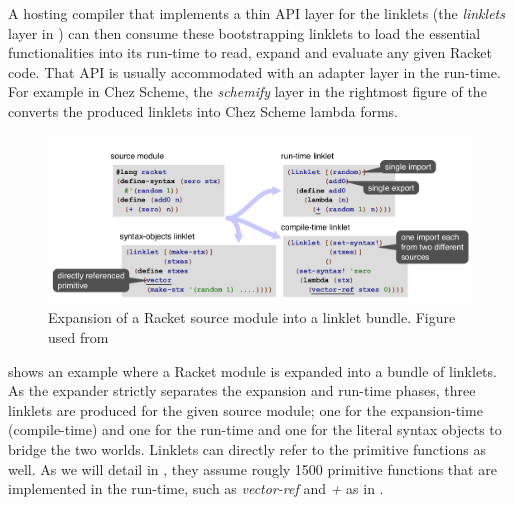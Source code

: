 A hosting compiler that implements a thin API layer for the linklets
(the \emph{linklets} layer in ) can then
consume these bootstrapping linklets to load the essential
functionalities into its run-time to read, expand and evaluate any
given Racket code. That API is usually accommodated with an adapter
layer in the run-time. For example in Chez Scheme, the \emph{schemify}
layer in the rightmost figure of the 
converts the produced linklets into Chez Scheme lambda forms.

\begin{figure}[h]
  \centering
  \includegraphics[scale=0.3]{img/racket-expand-example}
  \caption{Expansion of a Racket source module into a linklet
    bundle. Figure used from \cite{racket-on-chez-19}}
  \label{fig:racket-expand-example}
\end{figure}

 shows an example where a Racket
module is expanded into a bundle of linklets. As the expander strictly
separates the expansion and run-time phases, three linklets are
produced for the given source module; one for the expansion-time
(compile-time) and one for the run-time and one for the literal syntax
objects to bridge the two worlds. Linklets can directly refer to the
primitive functions as well. As we will detail in
, they assume rougly 1500 primitive functions
that are implemented in the run-time, such as \emph{vector-ref} and
\emph{+} as in .
